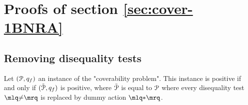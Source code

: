 \section{Proofs of section \ref{sec:cover-1BNRA}}

\label{app:cover-one-reg}
\subsection{Removing disequality tests}
\begin{corollary}
	\label{cor:removing_diseq_tests}
	Let $(\mathcal{P}, q_f)$ an instance of the "coverability problem". This instance is positive if and only if $(\tilde{\mathcal{P}}, q_f)$ is positive, where $\tilde{\mathcal{P}}$ is equal to $\mathcal{P}$ where every disequality test $\quotemarks{\diseqtestact}$ is replaced by dummy action $\quotemarks{\dummyact}$.  
\end{corollary}

